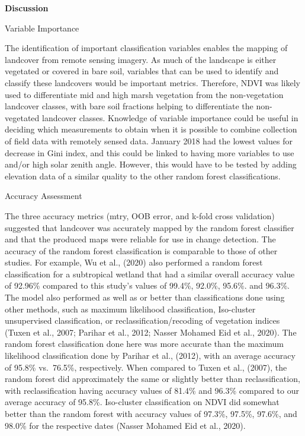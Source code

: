 \documentclass[
]{article}
\begin{document}
\textbf{Discussion}

Variable Importance

The identification of important classification variables enables the
mapping of landcover from remote sensing imagery. As much of the
landscape is either vegetated or covered in bare soil, variables that
can be used to identify and classify these landcovers would be important
metrics. Therefore, NDVI was likely used to differentiate mid and high
marsh vegetation from the non-vegetation landcover classes, with bare
soil fractions helping to differentiate the non-vegetated landcover
classes. Knowledge of variable importance could be useful in deciding
which measurements to obtain when it is possible to combine collection
of field data with remotely sensed data. January 2018 had the lowest
values for decrease in Gini index, and this could be linked to having
more variables to use and/or high solar zenith angle. However, this
would have to be tested by adding elevation data of a similar quality to
the other random forest classifications.

Accuracy Assessment

The three accuracy metrics (mtry, OOB error, and k-fold cross
validation) suggested that landcover was accurately mapped by the random
forest classifier and that the produced maps were reliable for use in
change detection. The accuracy of the random forest classification is
comparable to those of other studies. For example, Wu et al., (2020)
also performed a random forest classification for a subtropical wetland
that had a similar overall accuracy value of 92.96\% compared to this
study's values of 99.4\%, 92.0\%, 95.6\%. and 96.3\%. The model also
performed as well as or better than classifications done using other
methods, such as maximum likelihood classification, Iso-cluster
unsupervised classification, or reclassification/recoding of vegetation
indices (Tuxen et al., 2007; Parihar et al., 2012; Nasser Mohamed Eid et
al., 2020). The random forest classification done here was more accurate
than the maximum likelihood classification done by Parihar et al.,
(2012), with an average accuracy of 95.8\% vs.~76.5\%, respectively.
When compared to Tuxen et al., (2007), the random forest did
approximately the same or slightly better than reclassification, with
reclassification having accuracy values of 81.4\% and 96.3\% compared to
our average accuracy of 95.8\%. Iso-cluster classification on NDVI did
somewhat better than the random forest with accuracy values of 97.3\%,
97.5\%, 97.6\%, and 98.0\% for the respective dates (Nasser Mohamed Eid
et al., 2020).
\end{document}
